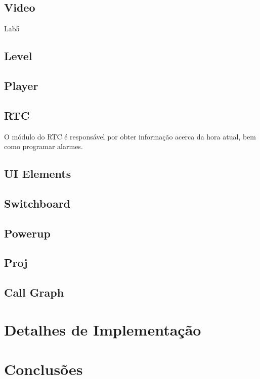 \documentclass{report}
\begin{document}
\section{Video}

Lab5

\section{Level}

\section{Player}

\section{RTC}

O módulo do RTC é responsável por obter informação acerca da hora atual, bem como programar alarmes.

\section{UI Elements}

\section{Switchboard}

\section{Powerup}

\section{Proj}

\section{Call Graph}

\chapter{Detalhes de Implementação}

\chapter{Conclusões}
\end{document}
